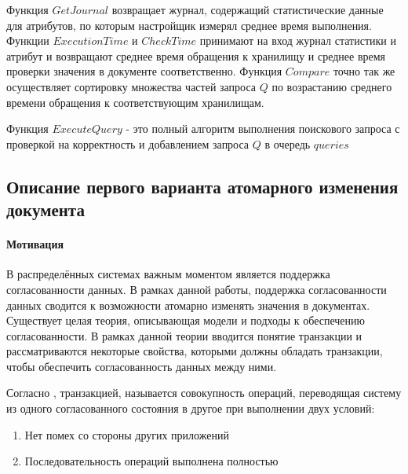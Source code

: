 \documentclass{matmex-diploma}
\begin{document}
        Функция $GetJournal$ возвращает журнал, содержащий статистические данные для атрибутов, по которым настройщик измерял среднее время выполнения. Функции $ExecutionTime$ и $CheckTime$ принимают на вход журнал статистики и атрибут и возвращают среднее время обращения к хранилищу и среднее время проверки значения в документе соответственно. Функция $Compare$ точно так же осуществляет сортировку множества частей запроса $Q$ по возрастанию среднего времени обращения к соответствующим хранилищам.
        
        Функция $ExecuteQuery$ - это полный алгоритм выполнения поискового запроса с проверкой на корректность и добавлением запроса $Q$ в очередь $queries$ 
        
    \subsection{Описание первого варианта атомарного изменения документа}
        \paragraph{Мотивация} В распределённых системах важным моментом является поддержка согласованности данных. В рамках данной работы, поддержка согласованности данных сводится к возможности атомарно изменять значения в документах. Существует целая теория, описывающая модели и подходы к обеспечению согласованности. В рамках данной теории вводится понятие транзакции и рассматриваются некоторые свойства, которыми должны обладать транзакции, чтобы обеспечить согласованность данных между ними. 
        
        Согласно \cite{novikov}, транзакцией, называется совокупность операций, переводящая систему из одного согласованного состояния в другое при выполнении двух условий:
        \begin{enumerate}
            \item Нет помех со стороны других приложений
            \item Последовательность операций выполнена полностью
        \end{enumerate}
        
\end{document}

